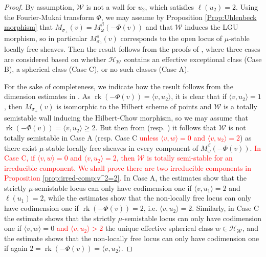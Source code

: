 \documentclass[leqno,11pt]{amsart}
\def\rk{\mathop{\mathrm{rk}}}
\theoremstyle{definition}
\def\HH{\ensuremath{\mathcal H}}
\def\WW{\ensuremath{\mathcal W}}
\begin{document}
\begin{proof}
By assumption, $\WW$ is not a wall for $u_2$, which satisfies $\ell(u_2)=2$.  Using the Fourier-Mukai transform $\Phi$, we may assume by Proposition \ref{Prop:Uhlenbeck morphism} that $M_{\sigma_+}(v)=M_{\omega}^{\beta}(-\Phi(v))$ and that $\WW$ induces the LGU morphism, so in particular $M^s_{\sigma_0}(v)$ corresponds to the open locus of $\mu$-stable locally free sheaves.  Then the result follows from the proofs of \cite[Proposition 2.6, Lemma 2.8, Proposition 2.11]{Yos16a}, where three cases are considered based on whether $\HH_{\WW}$ contains an effective exceptional class (Case B), a spherical class (Case C), or no such classes (Case A).  

For the sake of completeness, we indicate how the result follows from the dimension estimates in \cite{Yos16a}.  As $\rk(-\Phi(v))=\langle v,u_2\rangle$, it is clear that if $\langle v,u_2\rangle=1$, then $M_{\sigma_+}(v)$ is isomorphic to the Hilbert scheme of points and $\WW$ is a totally semistable wall inducing the Hilbert-Chow morphism, so we may assume that $\rk(-\Phi(v))=\langle v,u_2\rangle\geq 2$.  But then from \cite[Proposition 2.6]{Yos16a} (resp. \cite[Proposition 2.11]{Yos16a}) it follows that $\WW$ is not totally semistable in  Case A (resp. Case C \textcolor{red}{unless $\langle v,w \rangle=0$ and $\langle v,u_2 \rangle = 2$}) as there exist $\mu$-stable locally free sheaves in every component of $M_{\omega}^{\beta}(-\Phi(v))$.  \textcolor{red}{In Case C, if $\langle v,w \rangle=0$ and $\langle v,u_2 \rangle=2$, then
$\WW$ is totally semi-stable for an irreducible component. We shall prove there are two irreducible components in Proposition \ref{prop:irred-comp:v^2=2}.}
In Case A, the estimates \cite[(2.23-25)]{Yos16a} show that the strictly $\mu$-semistable locus can only have codimension one if $\langle v,u_1\rangle=2$ and $\ell(u_1)=2$, while the estimates \cite[(2.26,2.27)]{Yos16a} show that the non-locally free locus can only have codimension one if $\rk(-\Phi(v))=2$, i.e. $\langle v,u_2\rangle=2$.  Similarly, in Case C the estimate \cite[(2.39)]{Yos16a} shows that the strictly $\mu$-semistable locus can only have codimension one if 
$\langle v,w\rangle=0$ \textcolor{red}{and $\langle v,u_2 \rangle>2$} the unique effective spherical class $w\in\HH_{\WW}$, and the estimate \cite[(2.26) with $\delta=0$]{Yos16a} shows that the non-locally free locus can only have codimension one if again $2=\rk(-\Phi(v))=\langle v,u_2\rangle$.


\end{proof}
\end{document}
